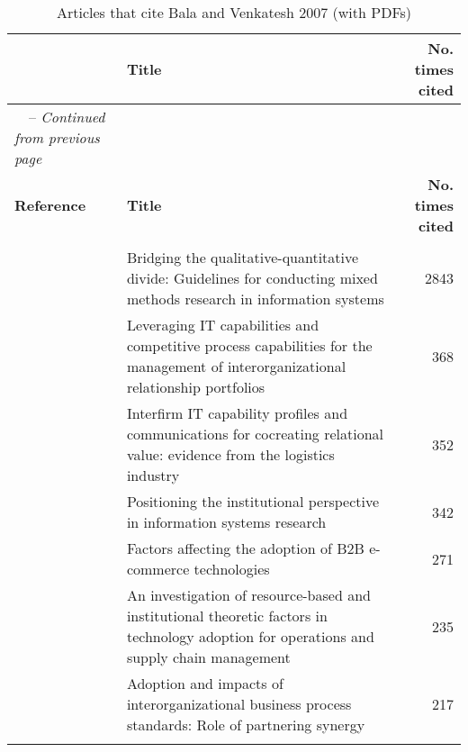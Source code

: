 \begin{longtable}{
		|>{\raggedright\arraybackslash}p{3.7cm}
		|>{\raggedright\arraybackslash}p{6cm}
		|r
		|}
	
	\hline 
	{\bf Reference} & {\bf Title} & {\bf No. times cited}  \\
	\hline
	\endfirsthead
	\multicolumn{3}{c}%
	{\tablename\ \thetable\ -- \textit{Continued from previous page}} \\
	\hline
	{\bf Reference} & {\bf Title} & {\bf No. times cited}  \\
	\hline
	\endhead
	\hline \multicolumn{3}{r}{\textit{Continued on next page}} \\
	\endfoot
	\hline
	\endlastfoot
	
	\cite{venkatesh2013bridging} & Bridging the qualitative-quantitative divide: Guidelines for conducting mixed methods research in information systems & 2843 \\
	\hline
	\cite{rai2010leveraging} & Leveraging IT capabilities and competitive process capabilities for the management of interorganizational relationship portfolios & 368 \\
	\hline
	\cite{rai2012interfirm} & Interfirm IT capability profiles and communications for cocreating relational value: evidence from the logistics industry & 352 \\
	\hline
	\cite{mignerat2015positioning} & Positioning the institutional perspective in information systems research & 342 \\
	\hline
	\cite{sila2013factors} & Factors affecting the adoption of B2B e-commerce technologies & 271 \\
	\hline
	\cite{zhang2009investigation} & An investigation of resource-based and institutional theoretic factors in technology adoption for operations and supply chain management & 235 \\
	\hline
	\cite{venkatesh2012adoption} & Adoption and impacts of interorganizational business process standards: Role of partnering synergy & 217 \\
	\hline

\caption{Articles that cite Bala and Venkatesh 2007 (with PDFs)}
\end{longtable}


